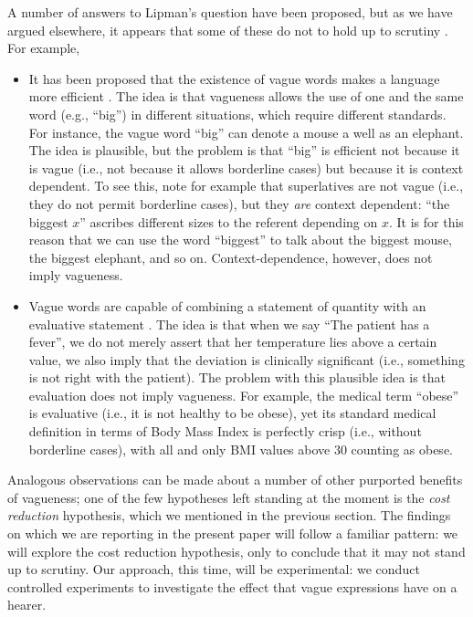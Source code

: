 A number of answers to Lipman's question have been proposed, but as we have argued elsewhere, it appears that some of these do not to hold up to scrutiny \citep{van2009utility,vanDeemterBook}. For example,
%
\begin{itemize}
\item It has been proposed that the existence of vague words makes a language more efficient \citep{barwiseperry}. The idea is that vagueness allows the use of one and the same word (e.g., ``big'') in different situations, which require different standards. For instance, the vague word ``big'' can denote a mouse a well as an elephant. The idea is plausible, but the problem is that ``big'' is efficient not because it is vague (i.e., not because it allows borderline cases) but because it is context dependent. To see this, note for example that superlatives are not vague (i.e., they do not permit borderline cases), but they {\em are} context dependent: ``the biggest $x$'' ascribes different sizes to the referent depending on $x$. It is for this reason that we can use the word ``biggest''  to talk about the biggest mouse, the biggest elephant, and so on. Context-dependence, however, does not imply vagueness.
%
\item Vague words are capable of combining a statement of quantity with an evaluative statement \citep{veltman}. The idea is that when we say ``The patient has a fever'', we do not merely assert that her temperature lies above a certain value, we also imply that the deviation is clinically significant (i.e., something is not right with the patient). The problem with this plausible idea is that evaluation does not imply vagueness. For example, the medical term ``obese'' is evaluative (i.e., it is not healthy to be obese), yet its standard medical definition in terms of Body Mass Index is perfectly crisp (i.e., without borderline cases), with all and only BMI values above 30 counting as obese.
\end{itemize}
%
Analogous observations can be made about a number of other purported benefits of vagueness; one of the few hypotheses left standing at the moment is the {\em cost reduction} hypothesis, which we mentioned in the previous section. The findings on which we are reporting in the present paper will follow a familiar pattern: we will explore the cost reduction hypothesis, only to conclude that it may not stand up to scrutiny. Our approach, this time, will be experimental: we conduct controlled experiments to investigate the effect that vague expressions have on a hearer. 

